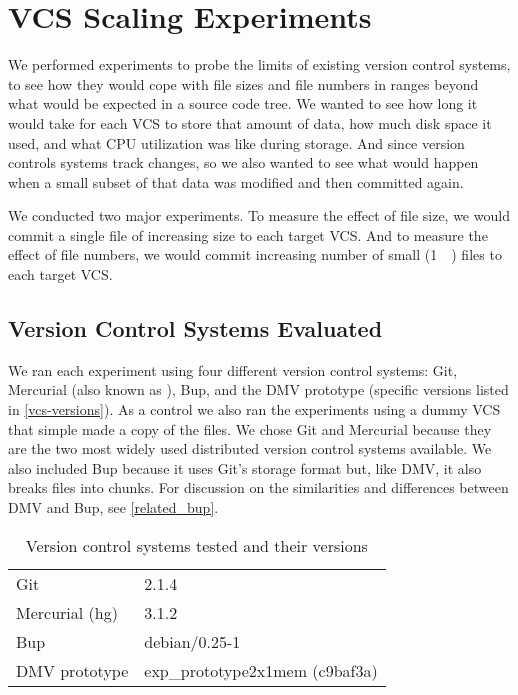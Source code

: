 \chapter{VCS Scaling Experiments}
\label{num-files-exp-desc}
\label{file-size-exp-desc}


We performed experiments to probe the limits of existing version control
systems, to see how they would cope with file sizes and file numbers in ranges
beyond what would be expected in a source code tree. We wanted to see how long
it would take for each VCS to store that amount of data, how much disk space it
used, and what CPU utilization was like during storage. And since version
controls systems track changes, so we also wanted to see what would happen when
a small subset of that data was modified and then committed again.

We conducted two major experiments. To measure the effect of file size, we would
\gls{commit} a single file of increasing size to each target VCS. And to measure
the effect of file numbers, we would \gls{commit} increasing number of small
(\SI{1}{\kibi\byte}) files to each target VCS.



\section{Version Control Systems Evaluated}

We ran each experiment using four different version control systems: Git,
Mercurial (also known as ), Bup, and the \gls{DMV} prototype
(specific versions listed in \autoref{vcs-versions}). As a control we also ran
the experiments using a dummy VCS that simple made a copy of the files. We chose
Git and Mercurial because they are the two most widely used distributed version
control systems available. We also included Bup because it uses Git's storage
format but, like \gls{DMV}, it also breaks files into chunks. For discussion on
the similarities and differences between \gls{DMV} and Bup, see
\autoref{related_bup}.


\begin{table}
    \caption{Version control systems tested and their versions}
    \label{vcs-versions}
    \centering
    \begin{tabular}{ l l }
        Git & 2.1.4 \\
        Mercurial (hg) & 3.1.2 \\
        Bup & debian/0.25-1 \\
        DMV prototype & exp\_prototype2x1mem (c9baf3a) \\
    \end{tabular}
\end{table}


